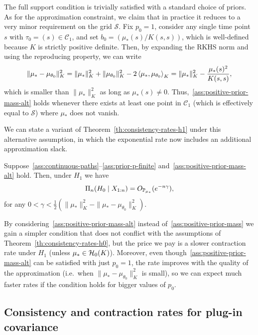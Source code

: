 The full support condition is trivially satisfied with a standard choice of priors. As for the approximation constraint, we claim that in practice it reduces to a very minor requirement on the grid \(\mathcal S\). Fix \(p_0=1\), consider any single time point \(s\) with \(\tau_0=(s)\in \mathcal C_1\), and set \(b_0=(\mu_*(s)/K(s,s))\), which is well-defined because \(K\) is strictly positive definite. Then, by expanding the \acs{RKHS} norm and using the reproducing property, we can write
\[
\|\mu_* - \mu_{\theta_0}\|^2_K = \|\mu_*\|^2_K + \|\mu_{\theta_0}\|^2_K - 2\left\langle\mu_*,\mu_{\theta_0}\right\rangle_K = \|\mu_*\|^2_K - \frac{\mu_*(s)^2}{K(s,s)},
\]
which is smaller than \(\|\mu_*\|^2_K\) as long as \(\mu_*(s)\neq 0\). Thus,~\ref{ass:positive-prior-mass-alt} holds whenever there exists at least one point in \(\mathcal C_1\) (which is effectively equal to \(\mathcal S\)) where \(\mu_*\) does not vanish. 

We can state a variant of Theorem~\ref{th:consistency-rates-h1} under this alternative assumption, in which the exponential rate now includes an additional approximation slack.

\begin{theorem}\label{th:consistency-rates-h1-alt}
  Suppose~\ref{ass:continuous-paths}--\ref{ass:prior-p-finite} and~\ref{ass:positive-prior-mass-alt} hold. Then, under \(H_1\) we have
  \[
    \Pi_n(H_0\mid X_{1:n}) = O_{\mathbb{P}_{\mu_*}}(e^{-n\gamma}),
  \]
  for any \(0 < \gamma < \frac{1}{2}(\|\mu_*\|^2_K - \|\mu_* - \mu_{\theta_0}\|^2_K)\).
\end{theorem}

\begin{remark}
  By considering~\ref{ass:positive-prior-mass-alt} instead of~\ref{ass:positive-prior-mass} we gain a simpler condition that does not conflict with the assumptions of Theorem~\ref{th:consistency-rates-h0}, but the price we pay is a slower contraction rate under \(H_1\) (unless \(\mu_* \in \mathcal{H}_0(K)\)). Moreover, even though~\ref{ass:positive-prior-mass-alt} can be satisfied with just \(p_0=1\), the rate improves with the quality of the approximation (i.e.\ when \(\|\mu_* - \mu_{\theta_0}\|^2_K\) is small), so we can expect much faster rates if the condition holds for bigger values of \(p_0\).
\end{remark}

\subsection{Consistency and contraction rates for plug-in covariance}\label{sec:consistency-plug-in}

